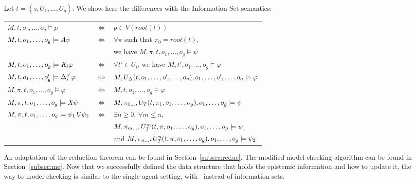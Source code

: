 Let $t=(s,U_1,\dots,U_g)$. We show here the differences with the Information Set semantics:\\
\begin{tabular}{l c l}
  $M,t,o_1,\dots,o_g\models p $&$ \iff $&$ p\in V(\mathit{root}(t))$\\
  $M,t,o_1,\dots,o_g\models\mathit{A}\psi $&$ \iff $&$ \forall\pi$ such that $\pi_0=\mathit{root}(t)$,\\
  & & we have $M,\pi,t,o_1,\dots,o_g\models\psi$\\
  $M,t,o_1,\dots,o_g\models\mathit{K}_i\varphi $&$ \iff $&$ \forall t'\in U_i$, we have $M,t',o_1,\dots,o_g\models\varphi$\\
  $M,t,o_1,\dots,o_g'\models\Delta^{o'}_i\varphi $&$ \iff $&$ M,U_{\Delta}(t,o_1,\dots,o',\dots,o_g),o_1,\dots,o',\dots,o_g\models\varphi$\\
  $M,\pi,t,o_1,\dots,o_g\models\varphi $&$ \iff $&$ M,t,o_1,\dots,o_g\models\varphi$\\
  $M,\pi,t,o_1,\dots,o_g\models\mathit{X}\psi $&$ \iff $&$ M,\pi_{1\dots},U_T(t,\pi_1,o_1,\dots,o_g),o_1,\dots,o_g\models\psi$\\
  $M,\pi,t,o_1,\dots,o_g\models\psi_1\mathit{U}\psi_2 $&$ \iff $&$ \exists n\geq 0$, $\forall m\leq n,$\\
  & & $M,\pi_{m\dots},U_T^m(t,\pi,o_1,\dots,o_g),o_1,\dots,o_g\models\psi_1$\\
  & & and $M,\pi_{n\dots},U_T^n(t,\pi,o_1,\dots,o_g),o_1,\dots,o_g\models\psi_2$
\end{tabular}

An adaptation of the reduction theorem can be found in Section~\ref{subsec:reduc}. The modified model-checking algorithm can be found in Section~\ref{subsec:mc}. Now that we successfully defined the data structure that holds the epistemic information and how to update it, the way to model-checking is similar to the single-agent setting, with \ktrees\ instead of information sets.
